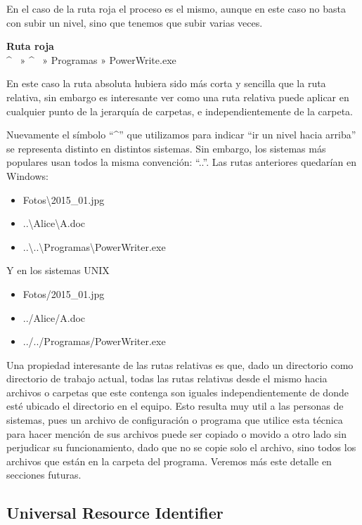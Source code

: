 En el caso de la ruta roja el proceso es el mismo, aunque en este caso no basta
con subir un nivel, sino que tenemos que subir varias veces.

\begin{example}
    \textbf{Ruta roja}\\
    \textasciicircum ~ » \textasciicircum ~ » Programas » PowerWrite.exe
\end{example}

En este caso la ruta absoluta hubiera sido más corta y sencilla que la ruta relativa,
sin embargo es interesante ver como una ruta relativa puede aplicar en cualquier
punto de la jerarquía de carpetas, e independientemente de la carpeta.

Nuevamente el símbolo ``\textasciicircum'' que utilizamos para indicar ``ir un nivel hacia arriba''
se representa distinto en distintos sistemas. Sin embargo, los sistemas más populares
usan todos la misma convención: ``..''. Las rutas anteriores quedarían en Windows:

\begin{itemize}
    \item Fotos\textbackslash 2015\_01.jpg
    \item ..\textbackslash Alice\textbackslash A.doc
    \item ..\textbackslash ..\textbackslash Programas\textbackslash PowerWriter.exe
\end{itemize}

Y en los sistemas UNIX
\begin{itemize}
    \item Fotos/2015\_01.jpg
    \item ../Alice/A.doc
    \item ../../Programas/PowerWriter.exe
\end{itemize}

Una propiedad interesante de las rutas relativas es que, dado un directorio
como directorio de trabajo actual, todas las rutas relativas desde el mismo
hacia archivos o carpetas que este contenga son iguales independientemente de
donde esté ubicado el directorio en el equipo. Esto resulta muy util a las personas
de sistemas, pues un archivo de configuración o programa que utilice esta técnica
para hacer mención de sus archivos puede ser copiado o movido a otro lado sin
perjudicar su funcionamiento, dado que no se copie solo el archivo, sino todos
los archivos que están en la carpeta del programa. Veremos más este detalle en
secciones futuras.

\subsection{Universal Resource Identifier}

